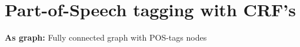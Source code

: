 \begin{comment}
	\pagebreak
\end{comment}

\section{Part-of-Speech tagging with CRF's}
\begin{comment}
\subsection{Structure}

	\begin{itemize}
	
	\item Part-of-Speech Tagging
	\begin{itemize}
	\item Task Definition
	\item Tag Sequences as Graph Paths
	\end{itemize}
	
	\item Conditional Random Fields
	\begin{itemize}
	\item Formal Equation
	\item Scoring Function
	\item Efficient Global Normalization
	\end{itemize}
	
	\item Semirings
	\begin{itemize}
	\item Definition
	\item In Action
	\end{itemize}
	
	\item Reframing CRFs
	\begin{itemize}
	\item Softmax Interpretation
	\item The Structured Perceptron
	\end{itemize}
	\end{itemize}
\end{comment}

\textbf{As graph:} Fully connected graph with POS-tags nodes
\begin{comment}
	POS-Tags are noun, verb, adj, etc, assume m tags.
	For a sentence of size n, we create a graph with n fully connected layers of m tags. When we score the edges, we can reformulate the problem to finding the best path through this graph, e.g. finding the most probable sequence of tags for this sentence.
\end{comment}


